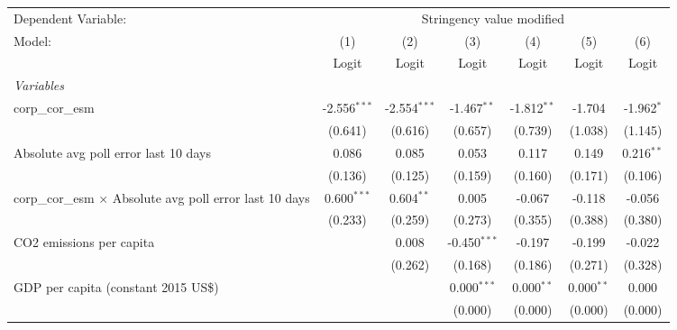 
\begingroup
\centering
\begin{tabular}{lcccccc}
   \toprule
   Dependent Variable: & \multicolumn{6}{c}{Stringency value modified}\\
   Model:                                                          & (1)            & (2)            & (3)            & (4)           & (5)          & (6)\\  
                                                                   &  Logit         & Logit          & Logit          & Logit         & Logit        & Logit\\  
   \midrule
   \emph{Variables}\\
   corp\_cor\_esm                                                  & -2.556$^{***}$ & -2.554$^{***}$ & -1.467$^{**}$  & -1.812$^{**}$ & -1.704       & -1.962$^{*}$\\   
                                                                   & (0.641)        & (0.616)        & (0.657)        & (0.739)       & (1.038)      & (1.145)\\   
   Absolute avg poll error last 10 days                            & 0.086          & 0.085          & 0.053          & 0.117         & 0.149        & 0.216$^{**}$\\   
                                                                   & (0.136)        & (0.125)        & (0.159)        & (0.160)       & (0.171)      & (0.106)\\   
   corp\_cor\_esm $\times$ Absolute avg poll error last 10 days    & 0.600$^{***}$  & 0.604$^{**}$   & 0.005          & -0.067        & -0.118       & -0.056\\   
                                                                   & (0.233)        & (0.259)        & (0.273)        & (0.355)       & (0.388)      & (0.380)\\   
   CO2 emissions per capita                                        &                & 0.008          & -0.450$^{***}$ & -0.197        & -0.199       & -0.022\\   
                                                                   &                & (0.262)        & (0.168)        & (0.186)       & (0.271)      & (0.328)\\   
   GDP per capita (constant 2015 US\$)                             &                &                & 0.000$^{***}$  & 0.000$^{**}$  & 0.000$^{**}$ & 0.000\\   
                                                                   &                &                & (0.000)        & (0.000)       & (0.000)      & (0.000)\\   

\end{tabular}
